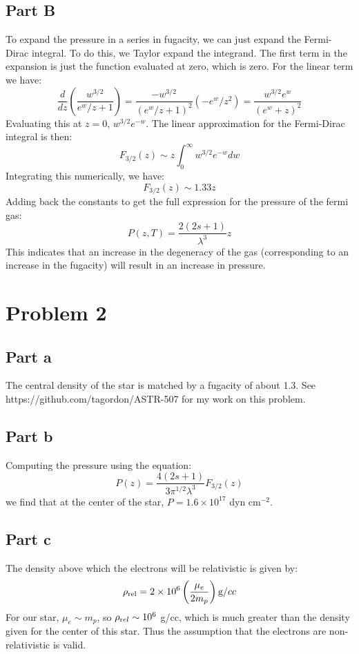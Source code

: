 \documentclass[a4paper, 11pt]{article}
\begin{document}
	\subsection*{Part B}
		To expand the pressure in a series in fugacity, we can just expand the Fermi-Dirac integral. To do 
		this, we Taylor expand the integrand. The first term in the expansion is just the function evaluated 
		at zero, which is zero. For the linear term we have:
		\begin{equation*}
			\frac{d}{dz}\left(\frac{w^{3/2}}{e^w/z + 1}\right) = \frac{-w^{3/2}}{(e^w/z+1)^2}(-e^w/z^2) = \frac{w^{3/2}e^w}{(e^w + z)^2}
		\end{equation*}
		Evaluating this at $z=0$, $w^{3/2}e^{-w}$. The linear approximation for the Fermi-Dirac integral is 
		then:
		\begin{equation*}
			F_{3/2}(z) \sim z\int_0^\infty w^{3/2}e^{-w}dw
		\end{equation*}
		Integrating this numerically, we have:
		\begin{equation*}
			F_{3/2}(z) \sim 1.33z
		\end{equation*} 
		Adding back the constants to get the full expression for the pressure of the fermi gas:
		\begin{equation*}
			P(z, T) = \frac{2(2s+1)}{\lambda^3}z
		\end{equation*}
		This indicates that an increase in the degeneracy of the gas (corresponding to an increase in the 
		fugacity) will result in an increase in pressure. 
\section*{Problem 2}
	\subsection*{Part a}
		The central density of the star is matched by a fugacity of about 1.3. 
		See https://github.com/tagordon/ASTR-507 for my work on this problem. 
	\subsection*{Part b}
		Computing the pressure using the equation:
		\begin{equation*}
			P(z) = \frac{4(2s+1)}{3\pi^{1/2}\lambda^3}F_{3/2}(z)
		\end{equation*}
		we find that at the center of the star, $P = 1.6\times10^{17}$ dyn cm$^{-2}$.
	\subsection*{Part c}
		The density above which the electrons will be relativistic is given by:
		\begin{equation*}
			\rho_\text{rel} = 2\times10^{6}\left(\frac{\mu_e}{2m_p}\right) {\text g/cc}
		\end{equation*}
		For our star, $\mu_e \sim m_p$, so $\rho_{\text rel} \sim 10^6$ g/cc, which is much greater 
		than the density given for the center of this star. Thus the assumption that the electrons 
		are non-relativistic is valid. 
\end{document}
